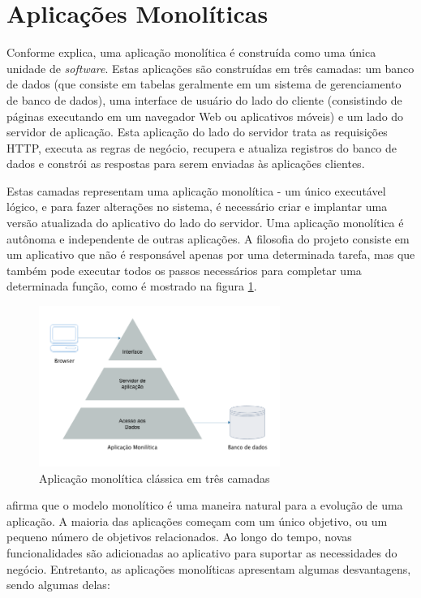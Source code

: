 \section{Aplicações Monolíticas}\label{sec:monolitico}

Conforme  explica, uma aplicação monolítica é construída como uma única unidade de \textit{software}. Estas aplicações são construídas em três camadas: um banco de dados (que consiste em tabelas geralmente em um sistema de gerenciamento de banco de dados), uma interface de usuário do lado do cliente (consistindo de páginas executando em um navegador Web ou aplicativos móveis) e um lado do servidor de aplicação. Esta aplicação do lado do servidor trata as requisições HTTP, executa as regras de negócio, recupera e atualiza registros do banco de dados e constrói as respostas para serem enviadas às aplicações clientes. 

Estas camadas representam uma aplicação monolítica - um único executável lógico, e para fazer alterações no sistema, é necessário criar e implantar uma versão atualizada do aplicativo do lado do servidor. Uma aplicação monolítica é autônoma e independente de outras aplicações. A filosofia do projeto consiste em um aplicativo que não é responsável apenas por uma determinada tarefa, mas que também pode executar todos os passos necessários para completar uma determinada função, como é mostrado na figura \ref{fig:three-tier}.

\begin{figure}[htbp]
    \centering
    \includegraphics[width=0.7\textwidth]{figuras/monolithic-3-tier.png}
    \caption{Aplicação monolítica clássica em três camadas}
    \label{fig:three-tier}
\end{figure}

 afirma que o modelo monolítico é uma maneira natural para a evolução de uma aplicação. A maioria das aplicações começam com um único objetivo, ou um pequeno número de objetivos relacionados. Ao longo do tempo, novas funcionalidades são adicionadas ao aplicativo para suportar as necessidades do negócio. Entretanto, as aplicações monolíticas apresentam algumas desvantagens, sendo algumas delas: 

